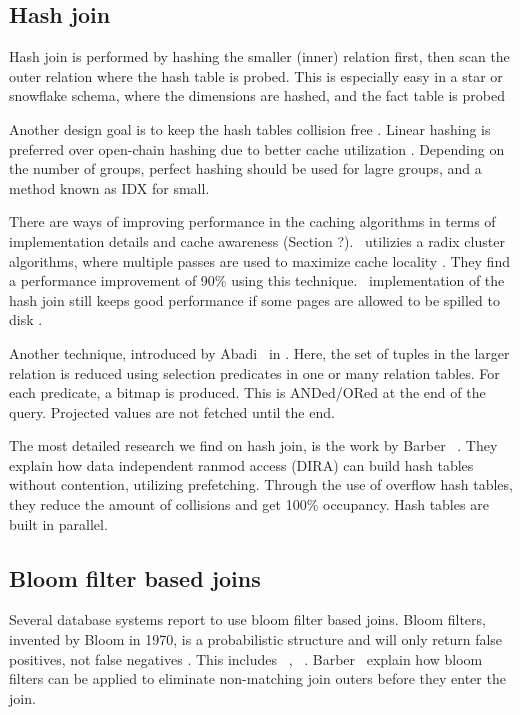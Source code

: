 \subsection{Hash join}
\label{sub:Hash join}
Hash join is performed by hashing the smaller (inner) relation first, then scan the outer relation where the hash table is probed. This is especially easy in a star or snowflake schema, where the dimensions are hashed, and the fact table is probed \cite{Barber2012-xt, Raman2013-em}

Another design goal is to keep the hash tables collision free \cite{Raman2013-em, Raman2008-gi}. Linear hashing is preferred over open-chain hashing due to better cache utilization \cite{Raman2008-gi}. Depending on the number of groups, perfect hashing should be used for lagre groups, and a method known as IDX for small.

There are ways of improving performance in the caching algorithms in terms of implementation details and cache awareness (Section ?). \monetdb~utilizies a radix cluster algorithms, where multiple passes are used to maximize cache locality \cite{Boncz2002-yj}. They find a performance improvement of 90\% using this technique. \mssql~implementation of the hash join still keeps good performance if some pages are allowed to be spilled to disk \cite{Larson2013-mc}. 

Another technique, introduced by Abadi \ea~in  \cite{Abadi2008-dd}. Here, the set of tuples in the larger relation is reduced using selection predicates in one or many relation tables. For each predicate, a bitmap is produced. This is ANDed/ORed at the end of the query. Projected values are not fetched until the end. 

The most detailed research we find on hash join, is the work by Barber \ea~\cite{Barber2014-ey}. They explain how data independent ranmod access (DIRA) can build hash tables without contention, utilizing prefetching. Through the use of overflow hash tables, they reduce the amount of collisions and get 100\% occupancy. Hash tables are built in parallel.


\subsection{Bloom filter based joins}
\label{sub:Bloom filter based joins}
Several database systems report to use bloom filter based joins. Bloom filters, invented by Bloom in 1970, is a probabilistic structure and will only return false positives, not false negatives \cite{Bloom1970-nr}. This includes \oracle~\cite{Lahiri2015-mz}, \ibm~\cite{Raman2013-em}. Barber \ea~explain how bloom filters can be applied to eliminate non-matching join outers before they enter the join.

